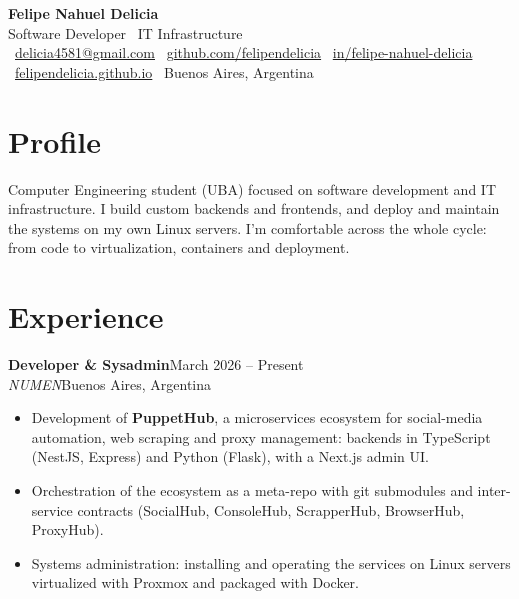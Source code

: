 \documentclass[10pt,a4paper]{article}
\newcommand{\role}[4]{%
  \textbf{#1}\hfill{\color{muted}\small #3}\\[1pt]
  \textit{#2}\hfill{\color{muted}\small #4}\par\vspace{0.25em}
}
\begin{document}
{\Huge\bfseries\color{ink} Felipe Nahuel Delicia}\\[3pt]
{\large\color{accent} Software Developer \textperiodcentered\ IT Infrastructure}\\[6pt]
{\small
\faEnvelope[regular]~\href{mailto:delicia4581@gmail.com}{delicia4581@gmail.com} \quad
\faGithub~\href{https://github.com/felipendelicia}{github.com/felipendelicia} \quad
\faLinkedin~\href{https://www.linkedin.com/in/felipe-nahuel-delicia/}{in/felipe-nahuel-delicia}\\[2pt]
\faGlobe~\href{https://felipendelicia.github.io/felipendelicia/}{felipendelicia.github.io} \quad
\faMapMarker*~Buenos Aires, Argentina
}

\section{Profile}
Computer Engineering student (UBA) focused on software development and IT infrastructure.
I build custom backends and frontends, and deploy and maintain the systems on my own Linux servers.
I'm comfortable across the whole cycle: from code to virtualization, containers and deployment.

\section{Experience}

\role{Developer \& Sysadmin}{NUMEN}{March 2026 -- Present}{Buenos Aires, Argentina}
\begin{itemize}
  \item Development of \textbf{PuppetHub}, a microservices ecosystem for social-media automation, web scraping and proxy management: backends in TypeScript (NestJS, Express) and Python (Flask), with a Next.js admin UI.
  \item Orchestration of the ecosystem as a meta-repo with git submodules and inter-service contracts (SocialHub, ConsoleHub, ScrapperHub, BrowserHub, ProxyHub).
  \item Systems administration: installing and operating the services on Linux servers virtualized with Proxmox and packaged with Docker.
\end{itemize}
\vspace{0.35em}
\end{document}
